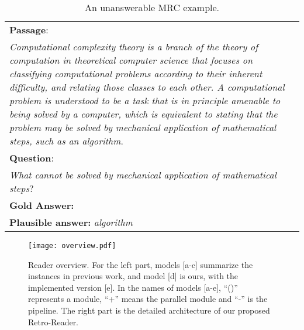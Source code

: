 \documentclass[letterpaper]{article} \usepackage{aaai21}  \usepackage{times}  \usepackage{helvet} \usepackage{courier}  \usepackage[hyphens]{url}  \usepackage{graphicx}
\begin{document}
\begin{table}[htb]
	\begin{center}
\begin{tabular}{|p{8.0cm}|}
\hline
\textbf{Passage}: \\ 
			\textit{Computational complexity theory is a branch of the theory of computation in theoretical computer science that focuses on classifying computational problems according to their inherent difficulty, and relating those classes to each other. A computational problem is understood to be a task that is in principle amenable to being solved by a computer, which is equivalent to stating that the problem may be \textcolor[RGB]{0,145,147}{solved by mechanical application of mathematical steps, such as an algorithm}}.\\ 
			\hline
\textbf{Question}: \\
			\textit{What cannot be solved by mechanical application of mathematical steps}?\\    
			\hline
			\textbf{Gold Answer:}  \\
			\textbf{Plausible answer:} \textit{algorithm} \\
			\hline
\end{tabular}
	\end{center}
	\caption{\label{table01} An unanswerable MRC example.}
\end{table}

\begin{figure*}[htb]
	\centering
	\texttt{[image: overview.pdf]}
	\caption{\label{fig:overview}  Reader overview. For the left part, models [a-c] summarize the instances in previous work, and model [d] is ours, with the implemented version [e]. In the names of models [a-e], ``()'' represents a module, ``+'' means the parallel module and ``-'' is the pipeline. The right part is the detailed architecture of our proposed Retro-Reader. }
\end{figure*}
\end{document}
